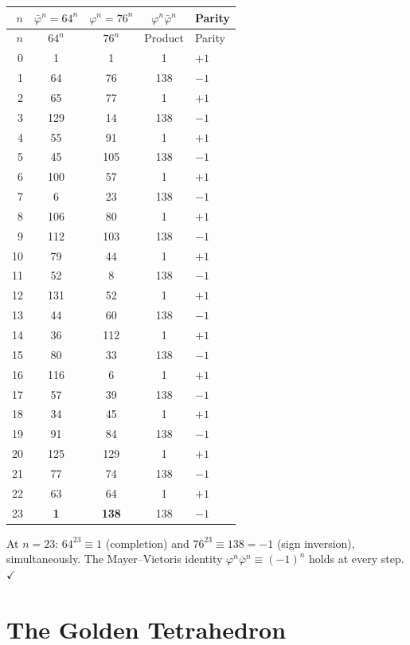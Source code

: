 \documentclass[12pt,oneside]{article}
\theoremstyle{principia}
\theoremstyle{definition}
\theoremstyle{remark}
\begin{document}
\begin{center}
\begin{longtable}{@{}rcccl@{}}
\toprule
$n$ & $\bar\varphi^n = 64^n$ & $\varphi^n = 76^n$ &
$\varphi^n \bar\varphi^n$ & Parity \\
\midrule
\endfirsthead
\toprule
$n$ & $64^n$ & $76^n$ & Product & Parity \\
\midrule
\endhead
0 & 1 & 1 & 1 & $+1$ \\
1 & 64 & 76 & 138 & $-1$ \\
2 & 65 & 77 & 1 & $+1$ \\
3 & 129 & 14 & 138 & $-1$ \\
4 & 55 & 91 & 1 & $+1$ \\
5 & 45 & 105 & 138 & $-1$ \\
6 & 100 & 57 & 1 & $+1$ \\
7 & 6 & 23 & 138 & $-1$ \\
8 & 106 & 80 & 1 & $+1$ \\
9 & 112 & 103 & 138 & $-1$ \\
10 & 79 & 44 & 1 & $+1$ \\
11 & 52 & 8 & 138 & $-1$ \\
12 & 131 & 52 & 1 & $+1$ \\
13 & 44 & 60 & 138 & $-1$ \\
14 & 36 & 112 & 1 & $+1$ \\
15 & 80 & 33 & 138 & $-1$ \\
16 & 116 & 6 & 1 & $+1$ \\
17 & 57 & 39 & 138 & $-1$ \\
18 & 34 & 45 & 1 & $+1$ \\
19 & 91 & 84 & 138 & $-1$ \\
20 & 125 & 129 & 1 & $+1$ \\
21 & 77 & 74 & 138 & $-1$ \\
22 & 63 & 64 & 1 & $+1$ \\
\midrule
23 & \textbf{1} & \textbf{138} & 138 & $-1$ \\
\bottomrule
\end{longtable}
\end{center}

At $n = 23$: $64^{23} \equiv 1$ (completion) and $76^{23} \equiv 138 = -1$
(sign inversion), simultaneously. The Mayer--Vietoris identity
$\varphi^n \bar\varphi^n \equiv (-1)^n$ holds at every step. $\checkmark$

\section{The Golden Tetrahedron}
\label{sec:tetrahedron}
\end{document}
